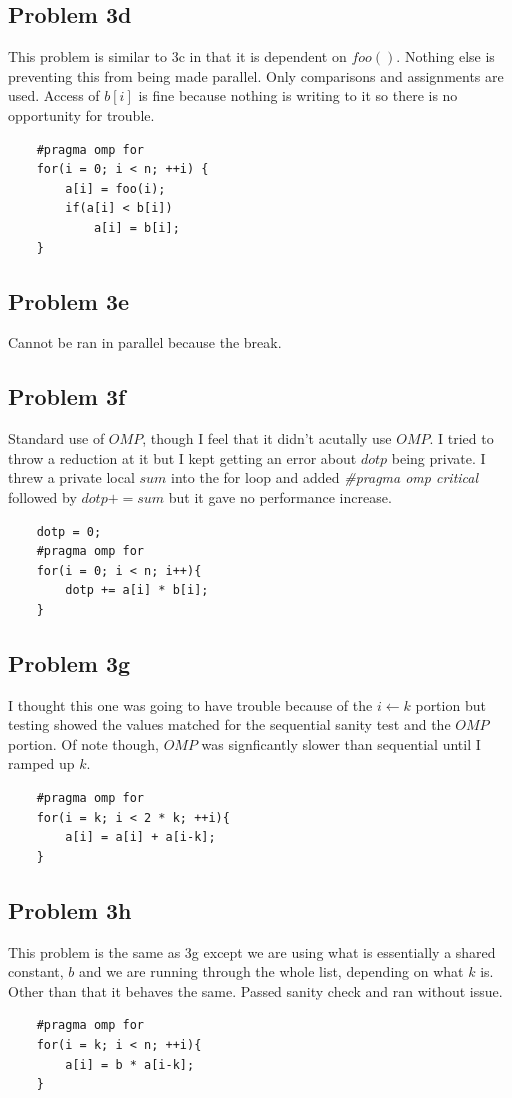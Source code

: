 \documentclass{article}
\begin{document}
\subsection{Problem 3d}
This problem is similar to 3c in that it is dependent on $foo()$. Nothing else is preventing this from being made parallel. Only comparisons and assignments are used. Access of $b[i]$ is fine because nothing is writing to it so there is no opportunity for trouble.
\begin{verbatim}
    #pragma omp for
    for(i = 0; i < n; ++i) {
        a[i] = foo(i);
        if(a[i] < b[i])
            a[i] = b[i];
    }
\end{verbatim}

\subsection{Problem 3e}
Cannot be ran in parallel because the break. 

\subsection{Problem 3f}
Standard use of $OMP$, though I feel that it didn't acutally use $OMP$. I tried to throw a reduction at it but I kept getting an error about $dotp$ being private. I threw a private local $sum$ into the for loop and added \textit{#pragma omp critical} followed by $dotp += sum$ but it gave no performance increase.
\begin{verbatim}
    dotp = 0;
    #pragma omp for
    for(i = 0; i < n; i++){
        dotp += a[i] * b[i];
    }
\end{verbatim}

\subsection{Problem 3g}
I thought this one was going to have trouble because of the $i\gets k$ portion but testing showed the values matched for the sequential sanity test and the $OMP$ portion. Of note though, $OMP$ was signficantly slower than sequential until I ramped up $k$.
\begin{verbatim}
    #pragma omp for
    for(i = k; i < 2 * k; ++i){
        a[i] = a[i] + a[i-k];
    }
\end{verbatim}

\subsection{Problem 3h}
This problem is the same as 3g except we are using what is essentially a shared constant, $b$ and we are running through the whole list, depending on what $k$ is. Other than that it behaves the same. Passed sanity check and ran without issue.
\begin{verbatim}
    #pragma omp for
    for(i = k; i < n; ++i){
        a[i] = b * a[i-k];
    }
\end{verbatim}
\end{document}
